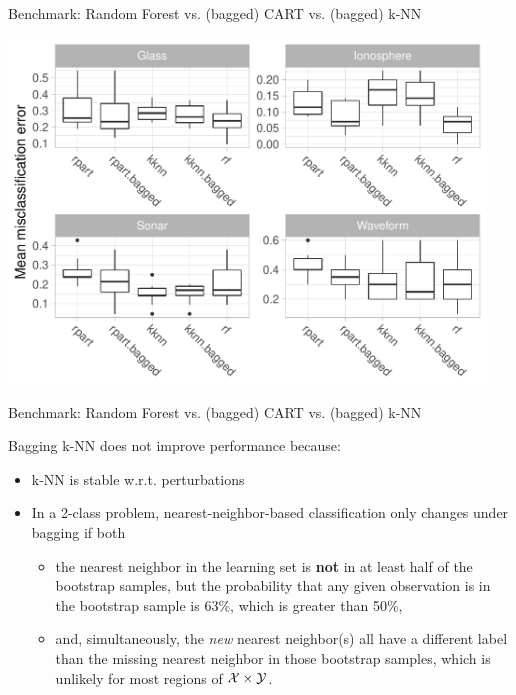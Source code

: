 \begin{vbframe}{Benchmark: Random Forest vs. (bagged) CART vs. (bagged) k-NN}
\framebreak

\begin{center}\includegraphics[width=0.95\textwidth]{figure_man/bm_stable_vs_unstable.pdf}\end{center}{}


\end{vbframe}

\begin{vbframe}{Benchmark: Random Forest vs. (bagged) CART vs. (bagged) k-NN}

  Bagging k-NN does not improve performance because:

  \begin{itemize}
    \item k-NN is stable w.r.t. perturbations
    \item In a 2-class problem, nearest-neighbor-based classification only changes under bagging if both
    \begin{itemize}
    \item the nearest neighbor in the learning set is \textbf{not} in at least half of the bootstrap samples, but the probability that any given observation is in the bootstrap sample is 63\%, which is greater than 50\%,
    \item and, simultaneously, the \emph{new} nearest neighbor(s) all have a different label than the missing nearest neighbor in those bootstrap samples, which is unlikely for most regions of $\mathcal{X} \times \mathcal{Y}$.
    \end{itemize}
\end{itemize}
\end{vbframe}


\endlecture

